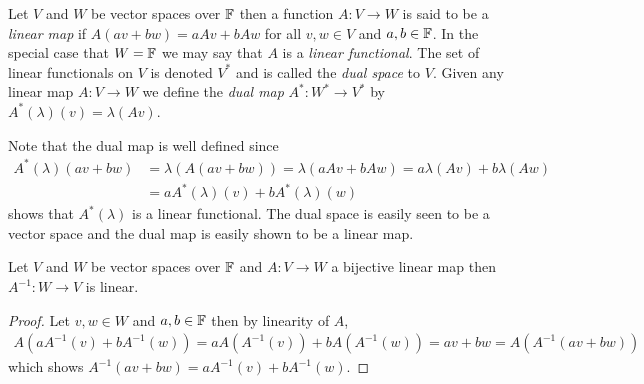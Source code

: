 \begin{defn}Let $V$ and $W$ be vector spaces over $\mathbb{F}$ then a function $A : V \to W$ is said to be a \emph{linear map} if $A (av + bw) = aAv + bAw$ for all $v,w \in V$ and $a,b \in \mathbb{F}$.  In the special case that $W = \mathbb{F}$ we may say that $A$ is a \emph{linear functional}.  The set of linear functionals on $V$ is denoted $V^*$ and is called the \emph{dual space} to $V$.  Given any linear map $A : V \to W$ we define the \emph{dual map} $A^* : W^* \to V^*$ by $A^*(\lambda)(v)= \lambda(Av)$.  
\end{defn}
Note that the dual map is well defined since 
\begin{align*}
  A^*(\lambda)(av + bw) &= \lambda(A(av+bw)) = \lambda(aAv + b A w) = a \lambda(Av) + b\lambda(Aw) \\
                        &= aA^*(\lambda)(v) + b A^*(\lambda)(w)
\end{align*}
shows that $A^*(\lambda)$ is a linear functional.  The dual space is easily seen to be a vector space and the dual map is easily shown to be a linear map.

\begin{prop}\label{linear:LinearityOfInverse}Let $V$ and $W$ be vector spaces over $\mathbb{F}$ and  $A : V \to W$ a bijective linear map then $A^{-1} : W \to V$ is linear.
\end{prop}
\begin{proof}
Let $v,w \in W$ and $a,b \in \mathbb{F}$ then by linearity of $A$,
\begin{align*}
A (a A^{-1}(v) + b A^{-1} (w)) = a A(A^{-1}(v)) + b A(A^{-1}(w)) = a v + b w = A(A^{-1}( av + b w))
\end{align*}
which shows $A^{-1}( av + b w) = a A^{-1}(v) + b A^{-1} (w)$.
\end{proof}

